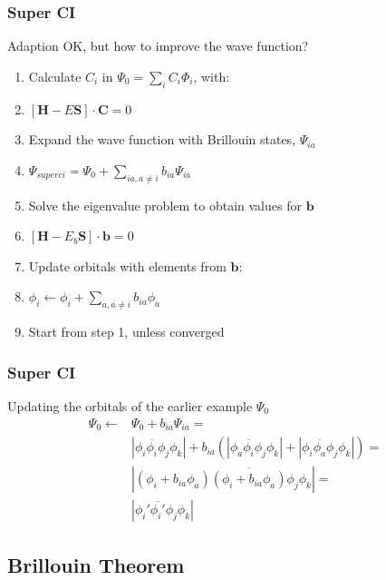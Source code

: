 \documentclass[]{beamer}
\begin{document}
\begin{frame}
  \frametitle{Super CI}
  Adaption OK, but how to improve the wave function?
  \begin{enumerate}  
    \item \alert<+> {Calculate $C_i$ in $\Psi_0 = \sum_{i} C_i \Phi_i$, with:}
    \item \alert<+> {$[\mathbf{H}-E\mathbf{S}] \cdot \mathbf{C} = 0$}
    \item \alert<+> {Expand the wave function with Brillouin states, $\Psi_{ia}$}
    \item \alert<+> {$\Psi_{superci} = \Psi_0 + \sum_{ia,a \neq i} b_{ia}\Psi_{ia}$}
    \item \alert<+> {Solve the eigenvalue problem to obtain values for $\mathbf{b}$}
    \item \alert<+> {$[\mathbf{H}-E_b\mathbf{S}] \cdot \mathbf{b} = 0$}
    \item \alert<+> {Update orbitals with elements from $\mathbf{b}$:}
    \item \alert<+> {$\phi_i \leftarrow \phi_i + \sum_{a,a \neq i} b_{ia}\phi_a$}
    \item \alert<+> {Start from step 1, unless converged}
  \end{enumerate}
\end{frame}

\begin{frame}
  \frametitle{Super CI}
  Updating the orbitals of the earlier example $\Psi_0$
  \begin{equation*}
    \begin{split}
      \Psi_{0} \leftarrow & \Psi_{0} + b_{ia} \Psi_{ia} = \\
      &|\phi_i\overline{\phi_i}\phi_j\phi_k| + b_{ia}(|\phi_a\overline{\phi_i}\phi_j\phi_k| + |\phi_i\overline{\phi_a}\phi_j\phi_k|) = \\
      &|(\phi_i + b_{ia}\phi_a)\overline{(\phi_i + b_{ia}\phi_a)}\phi_j\phi_k| = \\
      &|\phi_i'\overline{\phi_i'}\phi_j\phi_k |
    \end{split}
  \end{equation*}
\end{frame}

\subsection{Brillouin Theorem}
\end{document}
